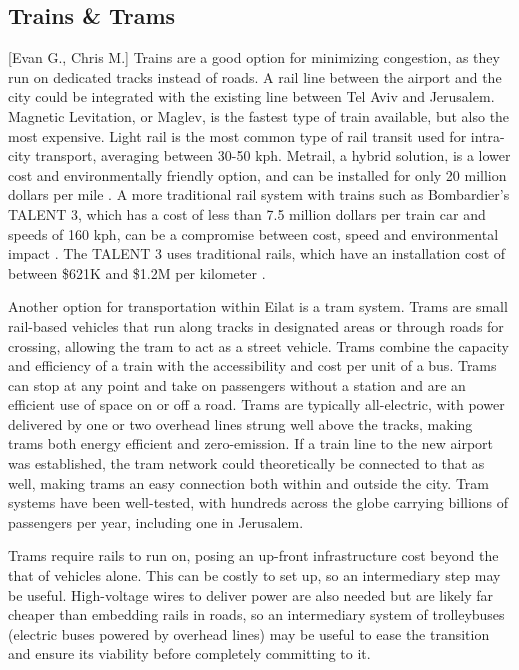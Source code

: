 \documentclass[12pt]{article}                         %
\begin{document}
\subsection{Trains \& Trams}[Evan G., Chris M.]
Trains are a good option for minimizing congestion, as they run on dedicated tracks instead of roads. A rail line between the airport and the city could be integrated with the existing line between Tel Aviv and Jerusalem. Magnetic Levitation, or Maglev, is the fastest type of train available, but also the most expensive. Light rail is the most common type of rail transit used for intra-city transport, averaging between 30-50 kph. Metrail, a hybrid solution, is a lower cost and environmentally friendly option, and can be installed for only 20 million dollars per mile \cite{MetrailTheSystem}. A more traditional rail system with trains such as Bombardier's TALENT 3, which has a cost of less than 7.5 million dollars per train car and speeds of 160 kph, can be a compromise between cost, speed and environmental impact \cite{Roy2017Bombardier1.9bn}. The TALENT 3 uses traditional rails, which have an installation cost of between \$621K and \$1.2M per kilometer \cite{ACWRailwayCompanyCostsSiding}.

Another option for transportation within Eilat is a tram system. Trams are small rail-based vehicles that run along tracks in designated areas or through roads for crossing, allowing the tram to act as a street vehicle. Trams combine the capacity and efficiency of a train with the accessibility and cost per unit of a bus. Trams can stop at any point and take on passengers without a station and are an efficient use of space on or off a road. Trams are typically all-electric, with power delivered by one or two overhead lines strung well above the tracks, making trams both energy efficient and zero-emission. If a train line to the new airport was established, the tram network could theoretically be connected to that as well, making trams an easy connection both within and outside the city. Tram systems have been well-tested, with hundreds across the globe carrying billions of passengers per year, including one in Jerusalem.

Trams require rails to run on, posing an up-front infrastructure cost beyond the that of vehicles alone. This can be costly to set up, so an intermediary step may be useful. High-voltage wires to deliver power are also needed but are likely far cheaper than embedding rails in roads, so an intermediary system of trolleybuses (electric buses powered by overhead lines) may be useful to ease the transition and ensure its viability before completely committing to it. 
\end{document}
